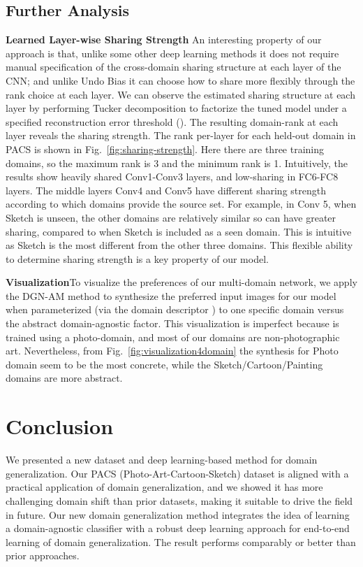\documentclass[10pt,twocolumn,letterpaper]{article}
\begin{document}
\subsection{Further Analysis}
\noindent\textbf{Learned Layer-wise Sharing Strength}\quad 
An interesting property of our approach is that, unlike some other deep learning methods \cite{ganin2015udaBackprop,long2015deepAdaptationNetworks} it does not require manual specification of the cross-domain sharing structure at each layer of the CNN; and unlike Undo Bias \cite{ECCV12_Khosla} it can choose how to share more flexibly through the rank choice at each layer. We can observe the estimated sharing structure at each layer by performing Tucker decomposition to factorize the tuned model under a specified reconstruction error threshold (). The resulting domain-rank at each layer reveals the sharing strength. 
The rank per-layer for each held-out domain in PACS is shown in Fig.~\ref{fig:sharing-strength}. Here there are three training domains, so the maximum rank is 3 and the minimum rank is 1. Intuitively, the results show heavily shared Conv1-Conv3 layers, and low-sharing in FC6-FC8 layers. The middle layers Conv4 and Conv5 have different sharing strength according to which domains provide the source set. For example, in Conv 5, when Sketch is unseen, the other domains are relatively similar so can have greater sharing, compared to when Sketch is included as a seen domain. This is intuitive as Sketch is the most different from the other three domains. This flexible ability to determine sharing strength is a key property of our model. 





\vspace{0.1cm}\noindent\textbf{Visualization}\quad To visualize the preferences of our multi-domain network, we apply the DGN-AM \cite{DBLP:journals/corr/NguyenDYBC16} method to synthesize the preferred input images for our model when parameterized (via the domain descriptor ) to one specific domain versus the abstract domain-agnostic factor. This visualization is imperfect because  \cite{DBLP:journals/corr/NguyenDYBC16} is trained using a photo-domain, and most of our domains are non-photographic art. 
Nevertheless, from  Fig.~\ref{fig:visualization4domain} the synthesis for Photo  domain seem to be the most concrete, while the Sketch/Cartoon/Painting domains are more abstract. 

\section{Conclusion} We presented a new dataset and deep learning-based method for domain generalization. Our PACS (Photo-Art-Cartoon-Sketch) dataset is aligned with a practical application of domain generalization, and we showed it has more challenging domain shift than prior datasets, making it suitable to drive the field in future. Our new domain generalization method integrates the idea of learning a domain-agnostic classifier with a robust deep learning approach for end-to-end learning of domain generalization. The result performs comparably or better than prior approaches.
\end{document}
